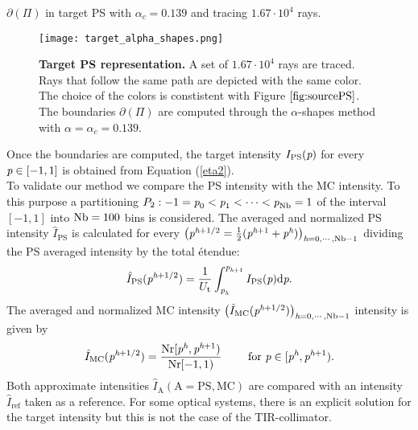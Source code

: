 $\partial$$(\Pi)$ in target PS  with $\alpha_c=0.139$ and tracing $1.67\cdot10^4$ rays.
  \begin{figure}[h]
  \begin{center}
  \texttt{[image: target\_alpha\_shapes.png]}
  \end{center}
  \caption{\textbf{Target PS representation.} A set of $1.67 \cdot 10^4$ rays are traced.
  Rays that follow the same path are depicted with the same color. The choice of the colors is constistent with Figure $\ref{fig:sourcePS}$. The boundaries $\partial$$(\Pi)$ are computed through the $\alpha$-shapes method with $\alpha = \alpha_c = 0.139$.}
  \label{fig:targetPS}
\end{figure}
Once the boundaries are computed, the target intensity $I_{\textrm{PS}}(\textit{p})$ for every $\textit{p}\in[-1,1]$ is obtained from Equation (\ref{eta2}). \\ \indent
To validate our method we compare the PS intensity with the MC intensity. 
To this purpose a partitioning $P_2:-1=\textit{p}_{0}<\textit{p}_1<\cdots<\textit{p}_{\textrm{Nb}}=1$ of the interval $[-1,1]$ into $\textrm{Nb}=100$ bins is considered. 
The averaged and normalized PS intensity $\hat{I}_{\textrm{PS}}$ is calculated for every 
$\big(\textit{p}^{\textit{h}+1/2} = \frac{1}{2}(\textit{p}^{\textit{h}+1}+ \textit{p}^{\textit{h}})\big)_{\textit{h}=0, \cdots, \textrm{Nb}-1}$ dividing the PS averaged intensity by the total \'{e}tendue:
\begin{equation}\label{eq:normalized_PS_intensity}
\hat{I}_{\textrm{PS}}(\textit{p}^{\textit{h}+1/2}) = \frac{1}{U_{\textrm{t}}}\int_{\textit{p}_{\textit{h}}}^{\textit{p}_{\textit{h}+1}} I_{\textrm{PS}}(\textit{p})\textrm{d}\textit{p}.
\end{equation}
The averaged and normalized MC intensity $\big(\hat{I}_{\textrm{MC}}(\textit{p}^{\textit{h}+1/2})\big)_{\textit{h} = 0, \cdots, \textrm{Nb}-1}$ intensity is given by
\begin{equation}\label{eq:normalized_MC_intensity}
\hat{I}_{\textrm{MC}}(\textit{p}^{\textit{h}+1/2}) = \frac{\textrm{Nr}[\textit{p}^{\textit{h}},\textit{p}^{\textit{h}+1})}{\textrm{Nr}[-1,1)} 
\qquad \mbox{ for } \textit{p}\in[\textit{p}^{\textit{h}}, \textit{p}^{\textit{h}+1}).
\end{equation} 
Both approximate intensities $\hat{I}_{\textrm{A}} (\textrm{A} = \textrm{PS}, \textrm{MC})$ are compared with an intensity $\hat{I}_{\textrm{ref}}$ taken as a reference. For some optical systems, there is an explicit solution for the target intensity but this is not the case of the TIR-collimator.
